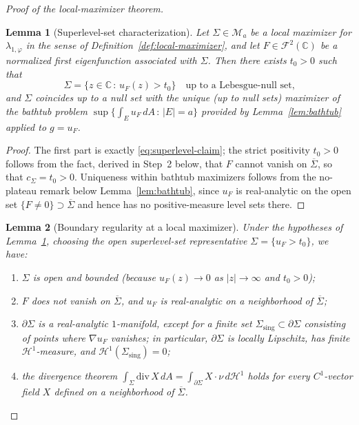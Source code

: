 \documentclass[a4paper,11pt,reqno]{amsart}
\numberwithin{equation}{section}
\theoremstyle{plain} %
\newtheorem{lemma}{Lemma}[section]
\theoremstyle{definition} %
\theoremstyle{remark}
\newcommand{\C}{\mathbb{C}}
\begin{document}
\begin{proof}[Proof of the local-maximizer theorem]
\begin{lemma}[Superlevel-set characterization]\label{lem:bathtub-superlevel-from-localmax}
Let \(\Sigma\in\mathcal M_a\) be a local maximizer for \(\lambda_{1,\varphi}\)
in the sense of Definition~\ref{def:local-maximizer}, and let \(F\in
\mathcal F^2(\C)\) be a normalized first eigenfunction associated with
\(\Sigma\). Then there exists \(t_0>0\) such that
\begin{equation}\label{eq:superlevel-strong}
\Sigma=\{z\in\C\,:\, u_F(z)>t_0\}\quad
\text{up to a Lebesgue-null set,}
\end{equation}
and \(\Sigma\) coincides up to a null set with the unique (up to null sets)
maximizer of the bathtub problem
\(\sup\{\int_E u_F\,dA\,:\,|E|=a\}\) provided by Lemma~\ref{lem:bathtub}
applied to \(g=u_F\).
\end{lemma}

\begin{proof}
The first part is exactly \eqref{eq:superlevel-claim}; the strict positivity
\(t_0>0\) follows from the fact, derived in Step~2 below, that \(F\) cannot
vanish on \(\overline\Sigma\), so that \(c_\Sigma=t_0>0\). Uniqueness within
bathtub maximizers follows from the no-plateau remark below
Lemma~\ref{lem:bathtub}, since \(u_F\) is real-analytic on the open set
\(\{F\ne 0\}\supset\overline\Sigma\) and hence has no positive-measure level
sets there.
\end{proof}

\begin{lemma}[Boundary regularity at a local maximizer]\label{lem:boundary-reg}
Under the hypotheses of Lemma~\ref{lem:bathtub-superlevel-from-localmax},
choosing the open superlevel-set representative
\(\Sigma=\{u_F>t_0\}\), we have:
\begin{enumerate}
\item[\textnormal{(i)}] \(\Sigma\) is open and bounded (because
\(u_F(z)\to 0\) as \(|z|\to\infty\) and \(t_0>0\));
\item[\textnormal{(ii)}] \(F\) does not vanish on \(\overline\Sigma\), and
\(u_F\) is real-analytic on a neighborhood of \(\overline\Sigma\);
\item[\textnormal{(iii)}] \(\partial\Sigma\) is a real-analytic
\(1\)-manifold, except for a finite set
\(\Sigma_{\mathrm{sing}}\subset \partial\Sigma\) consisting of points where
\(\nabla u_F\) vanishes; in particular, \(\partial\Sigma\) is locally
Lipschitz, has finite \(\mathcal H^1\)-measure, and
\(\mathcal H^1(\Sigma_{\mathrm{sing}})=0\);
\item[\textnormal{(iv)}] the divergence theorem
\(\int_\Sigma \mathrm{div}\,X\,dA=\int_{\partial\Sigma}X\cdot\nu\,
d\mathcal H^1\) holds for every \(C^1\)-vector field \(X\) defined on a
neighborhood of \(\overline\Sigma\).
\end{enumerate}
\end{lemma}


\end{proof}
\end{document}
